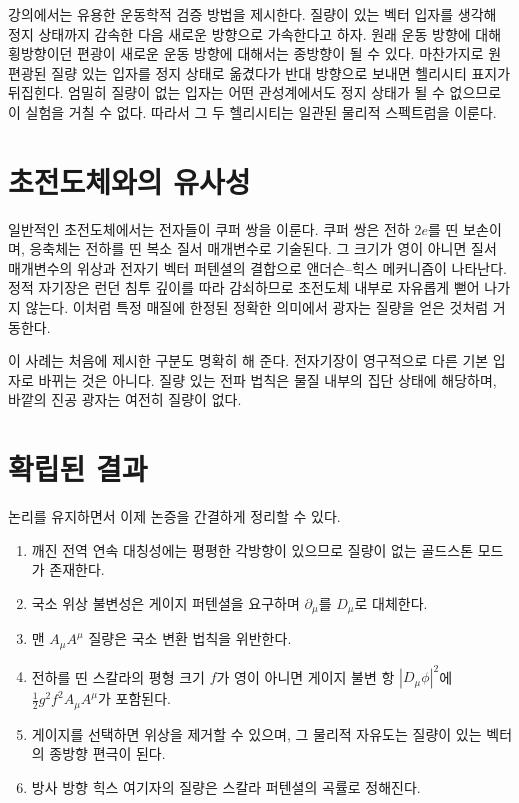 \begin{classroomqa}\end{classroomqa}

강의에서는 유용한 운동학적 검증 방법을 제시한다. 질량이 있는 벡터 입자를 생각해 정지 상태까지 감속한 다음 새로운 방향으로 가속한다고 하자. 원래 운동 방향에 대해 횡방향이던 편광이 새로운 운동 방향에 대해서는 종방향이 될 수 있다. 마찬가지로 원편광된 질량 있는 입자를 정지 상태로 옮겼다가 반대 방향으로 보내면 헬리시티 표지가 뒤집힌다. 엄밀히 질량이 없는 입자는 어떤 관성계에서도 정지 상태가 될 수 없으므로 이 실험을 거칠 수 없다. 따라서 그 두 헬리시티는 일관된 물리적 스펙트럼을 이룬다.

\section{초전도체와의 유사성}

일반적인 초전도체에서는 전자들이 쿠퍼 쌍을 이룬다. 쿠퍼 쌍은 전하 \(2e\)를 띤 보손이며, 응축체는 전하를 띤 복소 질서 매개변수로 기술된다. 그 크기가 영이 아니면 질서 매개변수의 위상과 전자기 벡터 퍼텐셜의 결합으로 앤더슨--힉스 메커니즘이 나타난다. 정적 자기장은 런던 침투 깊이를 따라 감쇠하므로 초전도체 내부로 자유롭게 뻗어 나가지 않는다. 이처럼 특정 매질에 한정된 정확한 의미에서 광자는 질량을 얻은 것처럼 거동한다.

이 사례는 처음에 제시한 구분도 명확히 해 준다. 전자기장이 영구적으로 다른 기본 입자로 바뀌는 것은 아니다. 질량 있는 전파 법칙은 물질 내부의 집단 상태에 해당하며, 바깥의 진공 광자는 여전히 질량이 없다.

\section{확립된 결과}

논리를 유지하면서 이제 논증을 간결하게 정리할 수 있다.
\begin{enumerate}
  \item 깨진 전역 연속 대칭성에는 평평한 각방향이 있으므로 질량이 없는 골드스톤 모드가 존재한다.
  \item 국소 위상 불변성은 게이지 퍼텐셜을 요구하며 \(\partial_\mu\)를 \(D_\mu\)로 대체한다.
  \item 맨 \(A_\mu A^\mu\) 질량은 국소 변환 법칙을 위반한다.
  \item 전하를 띤 스칼라의 평형 크기 \(f\)가 영이 아니면 게이지 불변 항 \(|D_\mu\phi|^2\)에 \(\frac12g^2f^2A_\mu A^\mu\)가 포함된다.
  \item 게이지를 선택하면 위상을 제거할 수 있으며, 그 물리적 자유도는 질량이 있는 벡터의 종방향 편극이 된다.
  \item 방사 방향 힉스 여기자의 질량은 스칼라 퍼텐셜의 곡률로 정해진다.
\end{enumerate}

